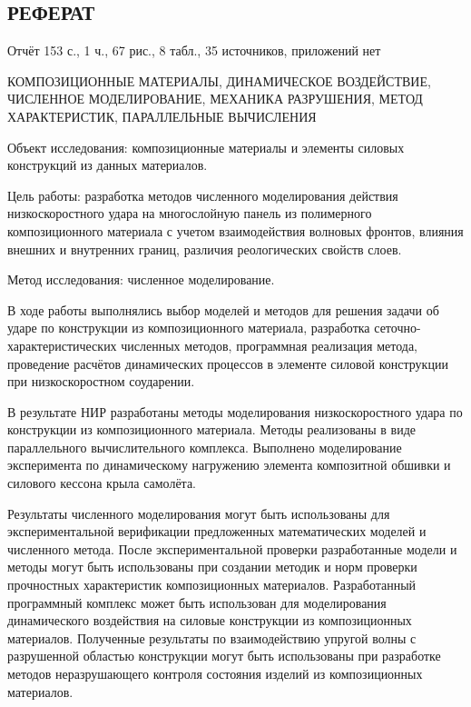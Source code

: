 \begin{center}\section*{РЕФЕРАТ}\end{center}

Отчёт 153 с., 1 ч., 67 рис., 8 табл., 35 источников, приложений нет

КОМПОЗИЦИОННЫЕ МАТЕРИАЛЫ, ДИНАМИЧЕСКОЕ ВОЗДЕЙСТВИЕ, ЧИСЛЕННОЕ МОДЕЛИРОВАНИЕ, МЕХАНИКА РАЗРУШЕНИЯ, МЕТОД ХАРАКТЕРИСТИК, ПАРАЛЛЕЛЬНЫЕ ВЫЧИСЛЕНИЯ

Объект исследования: композиционные материалы и элементы силовых конструкций из данных материалов.

Цель работы: разработка методов численного моделирования действия низкоскоростного удара на многослойную панель из полимерного композиционного материала с учетом взаимодействия волновых фронтов, влияния внешних и внутренних границ, различия реологических свойств слоев.

Метод исследования: численное моделирование.

В ходе работы выполнялись выбор моделей и методов для решения задачи об ударе по конструкции из композиционного материала, разработка сеточно-характеристических численных методов, программная реализация метода, проведение расчётов динамических процессов в элементе силовой конструкции при низкоскоростном соударении.

В результате НИР разработаны методы моделирования низкоскоростного удара по конструкции из композиционного материала. Методы реализованы в виде параллельного вычислительного комплекса. Выполнено моделирование эксперимента по динамическому нагружению элемента композитной обшивки и силового кессона крыла самолёта. 

Результаты численного моделирования могут быть использованы для экспериментальной верификации предложенных математических моделей и численного метода. После экспериментальной проверки разработанные модели и методы могут быть использованы при создании методик и норм проверки прочностных характеристик композиционных материалов. Разработанный программный комплекс может быть использован для моделирования динамического воздействия на силовые конструкции из композиционных материалов. Полученные результаты по взаимодействию упругой волны с разрушенной областью конструкции могут быть использованы при разработке методов неразрушающего контроля состояния изделий из композиционных материалов.

